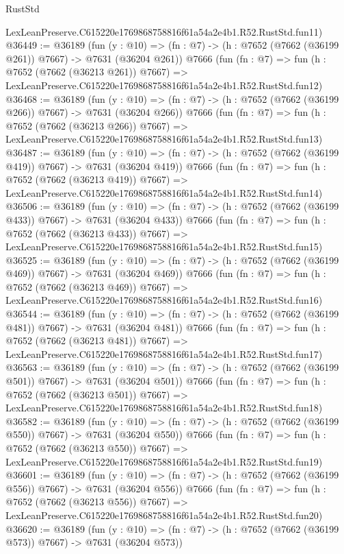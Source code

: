 \begin{lexlean}{RustStd}
\begin{coremodule}
    LexLeanPreserve.C615220e1769868758816f61a54a2e4b1.R52.RustStd.fun11)
@36449 := @36189
    (fun (y : @10) => (fn : @7) -> (h : @7652 (@7662 (@36199 @261)) @7667) -> @7631 (@36204 @261))
    @7666
    (fun (fn : @7) =>
    fun (h : @7652 (@7662 (@36213 @261)) @7667) =>
    LexLeanPreserve.C615220e1769868758816f61a54a2e4b1.R52.RustStd.fun12)
@36468 := @36189
    (fun (y : @10) => (fn : @7) -> (h : @7652 (@7662 (@36199 @266)) @7667) -> @7631 (@36204 @266))
    @7666
    (fun (fn : @7) =>
    fun (h : @7652 (@7662 (@36213 @266)) @7667) =>
    LexLeanPreserve.C615220e1769868758816f61a54a2e4b1.R52.RustStd.fun13)
@36487 := @36189
    (fun (y : @10) => (fn : @7) -> (h : @7652 (@7662 (@36199 @419)) @7667) -> @7631 (@36204 @419))
    @7666
    (fun (fn : @7) =>
    fun (h : @7652 (@7662 (@36213 @419)) @7667) =>
    LexLeanPreserve.C615220e1769868758816f61a54a2e4b1.R52.RustStd.fun14)
@36506 := @36189
    (fun (y : @10) => (fn : @7) -> (h : @7652 (@7662 (@36199 @433)) @7667) -> @7631 (@36204 @433))
    @7666
    (fun (fn : @7) =>
    fun (h : @7652 (@7662 (@36213 @433)) @7667) =>
    LexLeanPreserve.C615220e1769868758816f61a54a2e4b1.R52.RustStd.fun15)
@36525 := @36189
    (fun (y : @10) => (fn : @7) -> (h : @7652 (@7662 (@36199 @469)) @7667) -> @7631 (@36204 @469))
    @7666
    (fun (fn : @7) =>
    fun (h : @7652 (@7662 (@36213 @469)) @7667) =>
    LexLeanPreserve.C615220e1769868758816f61a54a2e4b1.R52.RustStd.fun16)
@36544 := @36189
    (fun (y : @10) => (fn : @7) -> (h : @7652 (@7662 (@36199 @481)) @7667) -> @7631 (@36204 @481))
    @7666
    (fun (fn : @7) =>
    fun (h : @7652 (@7662 (@36213 @481)) @7667) =>
    LexLeanPreserve.C615220e1769868758816f61a54a2e4b1.R52.RustStd.fun17)
@36563 := @36189
    (fun (y : @10) => (fn : @7) -> (h : @7652 (@7662 (@36199 @501)) @7667) -> @7631 (@36204 @501))
    @7666
    (fun (fn : @7) =>
    fun (h : @7652 (@7662 (@36213 @501)) @7667) =>
    LexLeanPreserve.C615220e1769868758816f61a54a2e4b1.R52.RustStd.fun18)
@36582 := @36189
    (fun (y : @10) => (fn : @7) -> (h : @7652 (@7662 (@36199 @550)) @7667) -> @7631 (@36204 @550))
    @7666
    (fun (fn : @7) =>
    fun (h : @7652 (@7662 (@36213 @550)) @7667) =>
    LexLeanPreserve.C615220e1769868758816f61a54a2e4b1.R52.RustStd.fun19)
@36601 := @36189
    (fun (y : @10) => (fn : @7) -> (h : @7652 (@7662 (@36199 @556)) @7667) -> @7631 (@36204 @556))
    @7666
    (fun (fn : @7) =>
    fun (h : @7652 (@7662 (@36213 @556)) @7667) =>
    LexLeanPreserve.C615220e1769868758816f61a54a2e4b1.R52.RustStd.fun20)
@36620 := @36189
    (fun (y : @10) => (fn : @7) -> (h : @7652 (@7662 (@36199 @573)) @7667) -> @7631 (@36204 @573))

\end{coremodule}
\end{lexlean}
